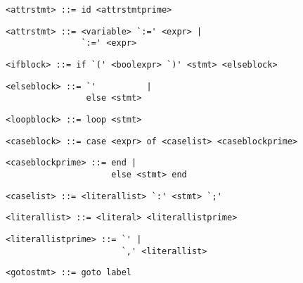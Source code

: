 \begin{footnotesize}
\begin{lstlisting}[frame=single, label={attrstmt}, language=pie]
<attrstmt> ::= id <attrstmtprime>
\end{lstlisting}

\begin{lstlisting}[frame=single, label={attrstmt}, language=pie]
<attrstmt> ::= <variable> `:=' <expr> |
               `:=' <expr>
\end{lstlisting}

\begin{lstlisting}[frame=single, label={ifblock}, language=pie]
<ifblock> ::= if `(' <boolexpr> `)' <stmt> <elseblock> 
\end{lstlisting}


\begin{lstlisting}[frame=single, label={elseblock}, language=pie]
<elseblock> ::= `'          |
                else <stmt>
\end{lstlisting}

\begin{lstlisting}[frame=single, label={loopblock}, language=pie]
<loopblock> ::= loop <stmt>
\end{lstlisting}

\begin{lstlisting}[frame=single, label={caseblock}, language=pie]
<caseblock> ::= case <expr> of <caselist> <caseblockprime>
\end{lstlisting}

\begin{lstlisting}[frame=single, label={caseblockprime}, language=pie]
<caseblockprime> ::= end |
                     else <stmt> end
\end{lstlisting}

\begin{lstlisting}[frame=single, label={caselist}, language=pie]
<caselist> ::= <literallist> `:' <stmt> `;'
\end{lstlisting}

\begin{lstlisting}[frame=single, label={literallist}, language=pie]
<literallist> ::= <literal> <literallistprime>
\end{lstlisting}

\begin{lstlisting}[frame=single, label={literallistprime}, language=pie]
<literallistprime> ::= `' |
                       `,' <literallist> 
\end{lstlisting}

\begin{lstlisting}[frame=single, label={gotostmt}, language=pie]
<gotostmt> ::= goto label
\end{lstlisting}


\end{footnotesize}
